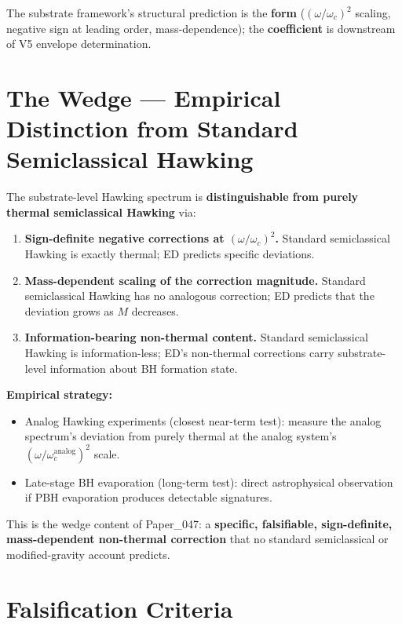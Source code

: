 \documentclass[11pt,a4paper]{article}
\begin{document}
The substrate framework's structural prediction is the \textbf{form} ($(\omega/\omega_c)^2$ scaling, negative sign at leading order, mass-dependence); the \textbf{coefficient} is downstream of V5 envelope determination.

\section{The Wedge --- Empirical Distinction from Standard Semiclassical Hawking}

The substrate-level Hawking spectrum is \textbf{distinguishable from purely thermal semiclassical Hawking} via:

\begin{enumerate}[noitemsep]
\item \textbf{Sign-definite negative corrections at $(\omega/\omega_c)^2$.} Standard semiclassical Hawking is exactly thermal; ED predicts specific deviations.
\item \textbf{Mass-dependent scaling of the correction magnitude.} Standard semiclassical Hawking has no analogous correction; ED predicts that the deviation grows as $M$ decreases.
\item \textbf{Information-bearing non-thermal content.} Standard semiclassical Hawking is information-less; ED's non-thermal corrections carry substrate-level information about BH formation state.
\end{enumerate}

\textbf{Empirical strategy:}

\begin{itemize}[noitemsep]
\item Analog Hawking experiments (closest near-term test): measure the analog spectrum's deviation from purely thermal at the analog system's $(\omega/\omega_c^\mathrm{analog})^2$ scale.
\item Late-stage BH evaporation (long-term test): direct astrophysical observation if PBH evaporation produces detectable signatures.
\end{itemize}

This is the wedge content of Paper\_047: a \textbf{specific, falsifiable, sign-definite, mass-dependent non-thermal correction} that no standard semiclassical or modified-gravity account predicts.

\section{Falsification Criteria}
\end{document}
